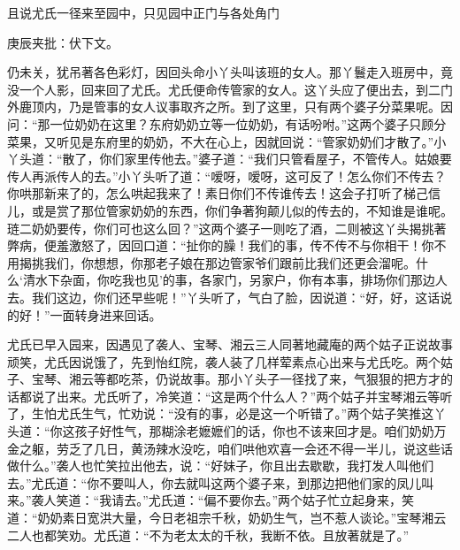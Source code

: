 \begin{parag}
    且说尤氏一径来至园中，只见园中正门与各处角门\begin{note}庚辰夹批：伏下文。\end{note}仍未关，犹吊著各色彩灯，因回头命小丫头叫该班的女人。那丫鬟走入班房中，竟没一个人影，回来回了尤氏。尤氏便命传管家的女人。这丫头应了便出去，到二门外鹿顶内，乃是管事的女人议事取齐之所。到了这里，只有两个婆子分菜果呢。因问：“那一位奶奶在这里？东府奶奶立等一位奶奶，有话吩咐。”这两个婆子只顾分菜果，又听见是东府里的奶奶，不大在心上，因就回说：“管家奶奶们才散了。”小丫头道：“散了，你们家里传他去。”婆子道：“我们只管看屋子，不管传人。姑娘要传人再派传人的去。”小丫头听了道：“嗳呀，嗳呀，这可反了！怎么你们不传去？你哄那新来了的，怎么哄起我来了！素日你们不传谁传去！这会子打听了梯己信儿，或是赏了那位管家奶奶的东西，你们争著狗颠儿似的传去的，不知谁是谁呢。琏二奶奶要传，你们可也这么回？”这两个婆子一则吃了酒，二则被这丫头揭挑著弊病，便羞激怒了，因回口道：“扯你的臊！我们的事，传不传不与你相干！你不用揭挑我们，你想想，你那老子娘在那边管家爷们跟前比我们还更会溜呢。什么‘清水下杂面，你吃我也见’的事，各家门，另家户，你有本事，排场你们那边人去。我们这边，你们还早些呢！”丫头听了，气白了脸，因说道：“好，好，这话说的好！”一面转身进来回话。
\end{parag}


\begin{parag}
    尤氏已早入园来，因遇见了袭人、宝琴、湘云三人同著地藏庵的两个姑子正说故事顽笑，尤氏因说饿了，先到怡红院，袭人装了几样荤素点心出来与尤氏吃。两个姑子、宝琴、湘云等都吃茶，仍说故事。那小丫头子一径找了来，气狠狠的把方才的话都说了出来。尤氏听了，冷笑道：“这是两个什么人？”两个姑子并宝琴湘云等听了，生怕尤氏生气，忙劝说：“没有的事，必是这一个听错了。”两个姑子笑推这丫头道：“你这孩子好性气，那糊涂老嬷嬷们的话，你也不该来回才是。咱们奶奶万金之躯，劳乏了几日，黄汤辣水没吃，咱们哄他欢喜一会还不得一半儿，说这些话做什么。”袭人也忙笑拉出他去，说：“好妹子，你且出去歇歇，我打发人叫他们去。”尤氏道：“你不要叫人，你去就叫这两个婆子来，到那边把他们家的凤儿叫来。”袭人笑道：“我请去。”尤氏道：“偏不要你去。”两个姑子忙立起身来，笑道：“奶奶素日宽洪大量，今日老祖宗千秋，奶奶生气，岂不惹人谈论。”宝琴湘云二人也都笑劝。尤氏道：“不为老太太的千秋，我断不依。且放著就是了。”
\end{parag}


